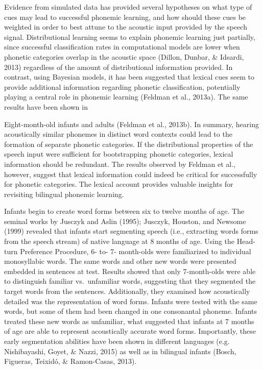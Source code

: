 \documentclass[man,floatsintext]{apa6}
\begin{document}
Evidence from simulated data has provided several hypotheses on what type of cues may lead to successful phonemic learning, and how should these cues be weighted in order to best attune to the acoustic input provided by the speech signal. Distributional learning seems to explain phonemic learning just partially, since successful classification rates in computational models are lower when phonetic categories overlap in the acoustic space (Dillon, Dunbar, \& Idsardi, 2013) regardless of the amount of distributional information provided. In contrast, using Bayesian models, it has been suggested that lexical cues seem to provide additional information regarding phonetic classification, potentially playing a central role in phonemic learning (Feldman et al., 2013a). The same results have been shown in

Eight-month-old infants and adults (Feldman et al., 2013b). In summary, hearing acoustically similar phonemes in distinct word contexts could lead to the formation of separate phonetic categories. If the distributional properties of the speech input were sufficient for bootstrapping phonetic categories, lexical information should be redundant. The results observed by Feldman et al., however, suggest that lexical information could indeed be critical for successfully for phonetic categories. The lexical account provides valuable insights for revisiting bilingual phonemic learning.

Infants begin to create word forms between six to twelve months of age. The seminal works by Jusczyk and Aslin (1995); Jusczyk, Houston, and Newsome (1999) revealed that infants start segmenting speech (i.e., extracting words forms from the speech stream) of native language at 8 months of age. Using the Head-turn Preference Procedure, 6- to- 7- month-olds were familiarized to individual monosyllabic words. The same words and other new words were presented embedded in sentences at test. Results showed that only 7-month-olds were able to distinguish familiar vs.~unfamiliar words, suggesting that they segmented the target words from the sentences. Additionally, they examined how acoustically detailed was the representation of word forms. Infants were tested with the same words, but some of them had been changed in one consonantal phoneme. Infants treated these new words as unfamiliar, what suggested that infants at 7 months of age are able to represent acoustically accurate word forms. Importantly, these early segmentation abilities have been shown in different languages (e.g. Nishibayashi, Goyet, \& Nazzi, 2015) as well as in bilingual infants (Bosch, Figueras, Teixidó, \& Ramon-Casas, 2013).
\end{document}
